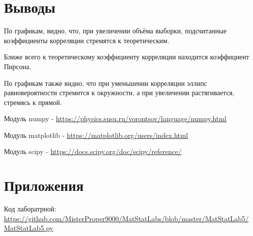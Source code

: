\documentclass[a4]{article}
\begin{document}
\section{Выводы}
По графикам, видно, что, при увеличении объёма выборки, подсчитанные коэффициенты корреляции стремятся к теоретическим.

Ближе всего к теоретическому коэффициенту корреляции находится коэффициент Пирсона.

По графикам также видно, что при уменьшении корреляции эллипс равновероятности стремится к окружности, а при увеличении растягивается, стремясь к прямой.



\begin{thebibliography}{}
      Модуль numpy  -  \url{https://physics.susu.ru/vorontsov/language/numpy.html}
    
    Модуль matplotlib - \url{https://matplotlib.org/users/index.html}
    
    Модуль scipy - \url{https://docs.scipy.org/doc/scipy/reference/}
    

\end{thebibliography}

\section{Приложения}


Код лаборатрной:\; \url{https://github.com/MisterProper9000/MatStatLabs/blob/master/MatStatLab5/MatStatLab5.py}
\end{document}
